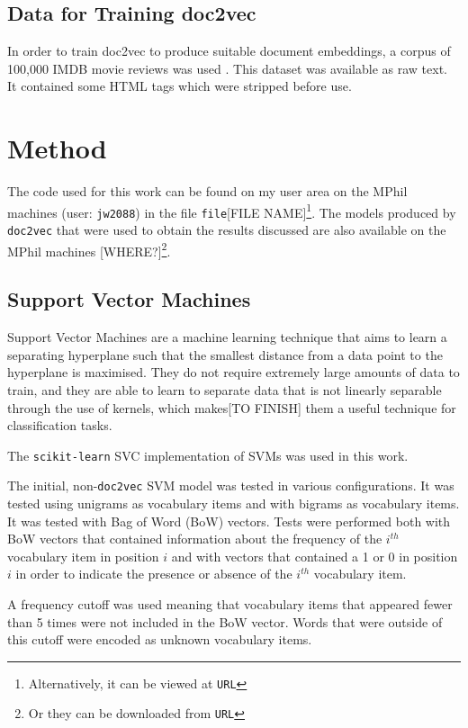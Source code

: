 \documentclass[twocolumn]{article}
\begin{document}
\subsection{Data for Training doc2vec}



In order to train doc2vec to produce suitable document embeddings, a corpus of 100,000 IMDB movie reviews was used \cite{bigimdb}. This dataset was available as raw text. It contained some HTML tags which were stripped before use.

\section{Method}

The code used for this work can be found on my user area on the MPhil machines (user: \texttt{jw2088}) in the file \texttt{file}[FILE NAME]\footnote{Alternatively, it can be viewed at \texttt{{URL}}}. The models produced by \texttt{doc2vec} that were used to obtain the results discussed are also available on the MPhil machines [WHERE?]\footnote{Or they can be downloaded from \texttt{{URL}}}. 

\subsection{Support Vector Machines}

Support Vector Machines are a machine learning technique that aims to learn a separating hyperplane such that the smallest distance from a data point to the hyperplane is maximised. They do not require extremely large amounts of data to train, and they are able to learn to separate data that is not linearly separable through the use of kernels, which makes[TO FINISH]
 them a useful technique for classification tasks.

The \texttt{scikit-learn}\cite{scikit-learn} SVC implementation of SVMs was used in this work.

The initial, non-\texttt{doc2vec} SVM model was tested in various configurations. It was tested using unigrams as vocabulary items and with bigrams as vocabulary items. It was tested with Bag of Word (BoW) vectors. Tests were performed both with BoW vectors that contained information about the frequency of the $i^{th}$ vocabulary item in position $i$ and with vectors that contained a 1 or 0 in position $i$ in order to indicate the presence or absence of the $i^{th}$ vocabulary item. 

A frequency cutoff was used meaning that vocabulary items that appeared fewer than 5 times were not included in the BoW vector. Words that were outside of this cutoff were encoded as unknown vocabulary items.
\end{document}
